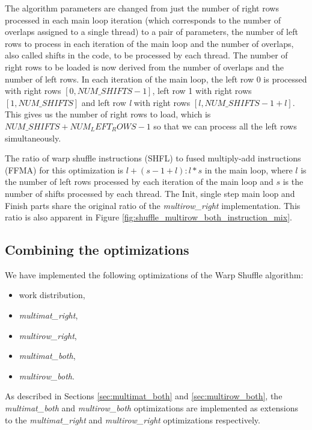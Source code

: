 The algorithm parameters are changed from just the number of right rows processed in each main loop iteration (which corresponds to the number of overlaps assigned to a single thread) to a pair of parameters, the number of left rows to process in each iteration of the main loop and the number of overlaps, also called shifts in the code, to be processed by each thread. The number of right rows to be loaded is now derived from the number of overlaps and the number of left rows. In each iteration of the main loop, the left row 0 is processed with right rows $[0, NUM\_SHIFTS - 1]$, left row 1 with right rows $[1, NUM\_SHIFTS]$ and left row \textit{l} with right rows $[l, NUM\_SHIFTS - 1 + l]$. This gives us the number of right rows to load, which is $NUM\_SHIFTS + NUM_LEFT_ROWS - 1$ so that we can process all the left rows simultaneously. 

The ratio of warp shuffle instructions (SHFL) to fused multiply-add instructions (FFMA) for this optimization is $l + (s - 1 + l) : l * s$ in the main loop, where $l$ is the number of left rows processed by each iteration of the main loop and $s$ is the number of shifts processed by each thread.  
The Init, single step main loop and Finish parts share the original ratio of the \textit{multirow\_right} implementation. This ratio is also apparent in Figure \ref{fig:shuffle_multirow_both_instruction_mix}.


\subsection{Combining the optimizations}
\label{sec:combining_optimizations}

We have implemented the following optimizations of the Warp Shuffle algorithm:

\begin{itemize}
	\item work distribution,
	\item \textit{multimat\_right},
	\item \textit{multirow\_right},
	\item \textit{multimat\_both},
	\item \textit{multirow\_both}.
\end{itemize}

As described in Sections \ref{sec:multimat_both} and \ref{sec:multirow_both}, the  \textit{multimat\_both} and \textit{multirow\_both} optimizations are implemented as extensions to the \textit{multimat\_right} and \textit{multirow\_right} optimizations respectively.


